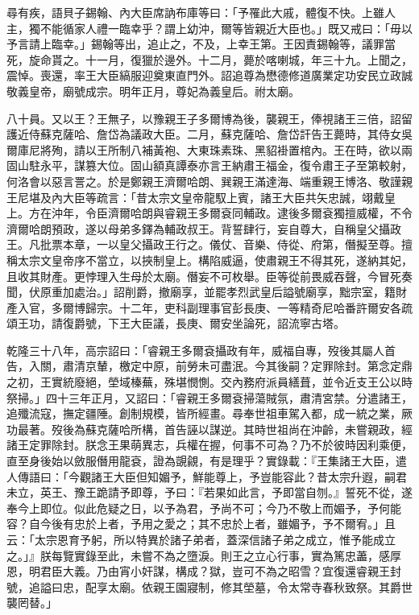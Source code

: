 \begin{pinyinscope}
尋有疾，語貝子錫翰、內大臣席訥布庫等曰：「予罹此大戚，體復不快。上雖人主，獨不能循家人禮一臨幸乎？謂上幼沖，爾等皆親近大臣也。」既又戒曰：「毋以予言請上臨幸。」錫翰等出，追止之，不及，上幸王第。王因責錫翰等，議罪當死，旋命貰之。十一月，復獵於邊外。十二月，薨於喀喇城，年三十九。上聞之，震悼。喪還，率王大臣縞服迎奠東直門外。詔追尊為懋德修道廣業定功安民立政誠敬義皇帝，廟號成宗。明年正月，尊妃為義皇后。祔太廟。

八十員。又以王？王無子，以豫親王子多爾博為後，襲親王，俸視諸王三倍，詔留護近侍蘇克薩哈、詹岱為議政大臣。二月，蘇克薩哈、詹岱訐告王薨時，其侍女吳爾庫尼將殉，請以王所制八補黃袍、大東珠素珠、黑貂褂置棺內。王在時，欲以兩固山駐永平，謀篡大位。固山額真譚泰亦言王納肅王福金，復令肅王子至第較射，何洛會以惡言詈之。於是鄭親王濟爾哈朗、巽親王滿達海、端重親王博洛、敬謹親王尼堪及內大臣等疏言：「昔太宗文皇帝龍馭上賓，諸王大臣共矢忠誠，翊戴皇上。方在沖年，令臣濟爾哈朗與睿親王多爾袞同輔政。逮後多爾袞獨擅威權，不令濟爾哈朗預政，遂以母弟多鐸為輔政叔王。背誓肆行，妄自尊大，自稱皇父攝政王。凡批票本章，一以皇父攝政王行之。儀仗、音樂、侍從、府第，僭擬至尊。擅稱太宗文皇帝序不當立，以挾制皇上。構陷威逼，使肅親王不得其死，遂納其妃，且收其財產。更悖理入生母於太廟。僭妄不可枚舉。臣等從前畏威吞聲，今冒死奏聞，伏原重加處治。」詔削爵，撤廟享，並罷孝烈武皇后謚號廟享，黜宗室，籍財產入官，多爾博歸宗。十二年，吏科副理事官彭長庚、一等精奇尼哈番許爾安各疏頌王功，請復爵號，下王大臣議，長庚、爾安坐論死，詔流寧古塔。

乾隆三十八年，高宗詔曰：「睿親王多爾袞攝政有年，威福自專，歿後其屬人首告，入關，肅清京輦，檄定中原，前勞未可盡泯。今其後嗣？定罪除封。第念定鼎之初，王實統廢絕，塋域榛蕪，殊堪憫惻。交內務府派員繕葺，並令近支王公以時祭掃。」四十三年正月，又詔曰：「睿親王多爾袞掃蕩賊氛，肅清宮禁。分遣諸王，追殲流寇，撫定疆陲。創制規模，皆所經畫。尋奉世祖車駕入都，成一統之業，厥功最著。歿後為蘇克薩哈所構，首告誣以謀逆。其時世祖尚在沖齡，未嘗親政，經諸王定罪除封。朕念王果萌異志，兵權在握，何事不可為？乃不於彼時因利乘便，直至身後始以斂服僭用龍袞，證為覬覦，有是理乎？實錄載：『王集諸王大臣，遣人傳語曰：「今觀諸王大臣但知媚予，鮮能尊上，予豈能容此？昔太宗升遐，嗣君未立，英王、豫王跪請予即尊，予曰：『若果如此言，予即當自刎。』誓死不從，遂奉今上即位。似此危疑之日，以予為君，予尚不可；今乃不敬上而媚予，予何能容？自今後有忠於上者，予用之愛之；其不忠於上者，雖媚予，予不爾宥。」且云：「太宗恩育予躬，所以特異於諸子弟者，蓋深信諸子弟之成立，惟予能成立之。」』朕每覽實錄至此，未嘗不為之墮淚。則王之立心行事，實為篤忠藎，感厚恩，明君臣大義。乃由宵小奸謀，構成？獄，豈可不為之昭雪？宜復還睿親王封號，追謚曰忠，配享太廟。依親王園寢制，修其塋墓，令太常寺春秋致祭。其爵世襲罔替。」


\end{pinyinscope}
